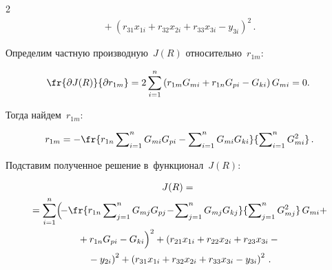 \begin{multicols}{2}
\begin{multline}
{}+ \left( r_{31}x_{1i} +r_{32}x_{2i} +r_{33}x_{3i}-y_{3i}\right)^2\,.

\label{e16-voh}

\end{multline}

  

  Определим частную производную~$J(R)$ относительно~$r_{1m}$:

  \begin{equation*}

  \hspace*{-1.63478pt}\fr{\partial J(R)}{\partial r_{1m}} =2\sum\limits^n_{i=1} \left( 

r_{1{m}}G_{mi} +r_{1{n}}G_{pi} -G_{ki}\right) G_{mi}=0.


  \end{equation*}

  Тогда найдем~$r_{1{m}}$:

  $$

  r_{1{m}}= -\fr{r_{1n}\sum\nolimits^n_{i=1} G_{mi} G_{pi}-

\sum\nolimits^n_{i=1} G_{mi} G_{ki}}{\sum\nolimits^n_{i=1} G_{mi}^2}\,.

  $$

  Подставим полученное решение в~функционал~$J(R)$:

  \begin{multline}

  J(R)={}\\

  {}=\sum\limits^n_{i=1} \!\left(\! -\fr{r_{1{n}}\sum\nolimits^n_{j=1} 

G_{mj} G_{pj} \!-\!\sum\nolimits^n_{j=1} G_{mj} G_{kj}} {\sum\nolimits^n_{j=1} 

G_{mj}^2}\,G_{mi} +\right.\\

\left.{}+r_{1n}G_{pi} -G_{ki}

\vphantom{\fr{r_{1\mathrm{n}}\sum\nolimits^n_{j=1} 

G_{mj} G_{pj} -\sum\nolimits^n_{j=1} G_{mj} G_{kj}} {\sum\nolimits^n_{j=1} 

G_{mj}^2}}

\right)^2+

 \left( r_{21}x_{1i} +r_{22}x_{2i} + r_{23}x_{3i}-{}\right.\\

\left. {}-y_{2i}\right)^2+ \left( r_{31}x_{1i} +r_{32}x_{2i} +r_{33}x_{3i}-y_{3i}\right)^2\,.


\end{multline}
\end{multicols}
